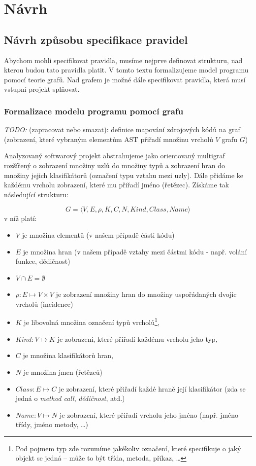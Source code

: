 \chapter{Návrh}

\section{Návrh způsobu specifikace pravidel}

Abychom mohli specifikovat pravidla, musíme nejprve definovat strukturu, nad kterou budou tato pravidla platit. V tomto textu formalizujeme model programu pomocí teorie grafů. Nad grafem je možné dále specifikovat pravidla, která musí vstupní projekt splňovat.

\subsection{Formalizace modelu programu pomocí grafu}
\label{design-graph_formalization}

\emph{TODO:} (zapracovat nebo smazat): definice mapování zdrojových kódů na graf (zobrazení, které vybraným elementům AST přiřadí množinu vrcholů $V$ grafu $G$)

Analyzovaný softwarový projekt abstrahujeme jako orientovaný multigraf rozšířený o zobrazení množiny uzlů do množiny typů a zobrazení hran do množiny jejich klasifikátorů (označení typu vztahu mezi uzly). Dále přidáme ke každému vrcholu zobrazení, které mu přiřadí jméno (řetězec). Získáme tak následující strukturu:

\begin{displaymath}
  G = \langle V, E, \rho, K, C, N, \mathit{Kind}, \mathit{Class}, \mathit{Name}\rangle
  \label{extended_multigraph}
\end{displaymath}
v níž platí:
\begin{itemize}
\item $V$ je množina elementů (v našem případě části kódu)
\item $E$ je množina hran (v našem případě vztahy mezi částmi kódu - např. volání funkce, dědičnost)
\item $V \cap E = \emptyset$
\item $\rho: E \mapsto V \times V$ je zobrazení množiny hran do množiny uspořádaných dvojic vrcholů (incidence)
\item $K$ je libovolná množina označení typů vrcholů\footnote{Pod pojmem typ zde rozumíme jakékoliv označení, které specifikuje o jaký objekt se jedná -- může to být třída, metoda, příkaz, \ldots},
\item $\mathit{Kind}: V \mapsto K$ je zobrazení, které přiřadí každému vrcholu jeho typ,
\item $C$ je množina klasifikátorů hran,
\item $N$ je množina jmen (řetězců)
\item $\mathit{Class}: E \mapsto C$ je zobrazení, které přiřadí každé hraně její klasifikátor (zda se jedná o \emph{method call}, \emph{dědičnost}, atd.)
\item $\mathit{Name}: V \mapsto N$ je zobrazení, které přiřadí vrcholu jeho jméno (např. jméno třídy, jméno metody, \ldots)
\end{itemize}

